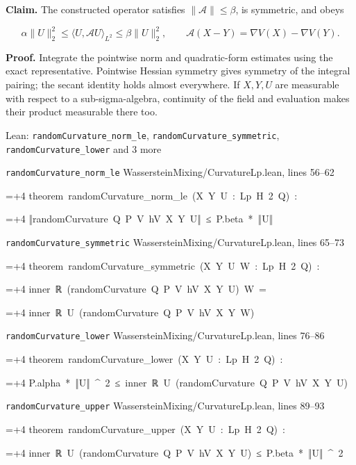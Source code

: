 \documentclass[11pt,a4paper]{article}
\newlength{\leancharwidth}
\newenvironment{leancode}{\par\smallskip\begingroup\ttfamily\footnotesize\raggedright
  \settowidth{\leancharwidth}{M}\setlength{\parskip}{0pt}\setlength{\parindent}{0pt}
  \frenchspacing}{\par\endgroup\smallskip}
\newcommand{\leanline}[2]{\hangindent=\dimexpr#1\leancharwidth+4\leancharwidth\relax
  \hangafter=1\noindent\hspace*{#1\leancharwidth}#2\par}
\newcommand{\leansource}[1]{\par{\footnotesize\color{leanmuted}#1}\par}
\begin{document}
\textbf{Claim.} The constructed operator satisfies \(\|\mathcal A\|\le\beta\), is symmetric, and obeys

\[\alpha\|U\|_2^2\le\langle U,\mathcal A U\rangle_{L^2}\le\beta\|U\|_2^2,\qquad \mathcal A(X-Y)=\nabla V(X)-\nabla V(Y).\]

\textbf{Proof.} Integrate the pointwise norm and quadratic-form estimates using the exact representative. Pointwise Hessian symmetry gives symmetry of the integral pairing; the secant identity holds almost everywhere. If \(X,Y,U\) are measurable with respect to a sub-sigma-algebra, continuity of the field and evaluation makes their product measurable there too.

\begin{leanbox}{Lean: \texttt{randomCurvature\_\allowbreak{}norm\_\allowbreak{}le}, \texttt{randomCurvature\_\allowbreak{}symmetric}, \texttt{randomCurvature\_\allowbreak{}lower} and 3 more}
\leansource{\texttt{randomCurvature\_\allowbreak{}norm\_\allowbreak{}le} \quad WassersteinMixing/\allowbreak{}CurvatureLp.lean, lines 56–62}
\begin{leancode}
\leanline{0}{theorem\ randomCurvature\_norm\_le\ (X\ Y\ U\ :\ Lp\ H\ 2\ Q)\ :}
\leanline{4}{‖randomCurvature\ Q\ P\ V\ hV\ X\ Y\ U‖\ ≤\ P.beta\ *\ ‖U‖}
\end{leancode}
\leansource{\texttt{randomCurvature\_\allowbreak{}symmetric} \quad WassersteinMixing/\allowbreak{}CurvatureLp.lean, lines 65–73}
\begin{leancode}
\leanline{0}{theorem\ randomCurvature\_symmetric\ (X\ Y\ U\ W\ :\ Lp\ H\ 2\ Q)\ :}
\leanline{4}{inner\ ℝ\ (randomCurvature\ Q\ P\ V\ hV\ X\ Y\ U)\ W\ =}
\leanline{6}{inner\ ℝ\ U\ (randomCurvature\ Q\ P\ V\ hV\ X\ Y\ W)}
\end{leancode}
\leansource{\texttt{randomCurvature\_\allowbreak{}lower} \quad WassersteinMixing/\allowbreak{}CurvatureLp.lean, lines 76–86}
\begin{leancode}
\leanline{0}{theorem\ randomCurvature\_lower\ (X\ Y\ U\ :\ Lp\ H\ 2\ Q)\ :}
\leanline{4}{P.alpha\ *\ ‖U‖\ \textasciicircum{}\ 2\ ≤\ inner\ ℝ\ U\ (randomCurvature\ Q\ P\ V\ hV\ X\ Y\ U)}
\end{leancode}
\leansource{\texttt{randomCurvature\_\allowbreak{}upper} \quad WassersteinMixing/\allowbreak{}CurvatureLp.lean, lines 89–93}
\begin{leancode}
\leanline{0}{theorem\ randomCurvature\_upper\ (X\ Y\ U\ :\ Lp\ H\ 2\ Q)\ :}
\leanline{4}{inner\ ℝ\ U\ (randomCurvature\ Q\ P\ V\ hV\ X\ Y\ U)\ ≤\ P.beta\ *\ ‖U‖\ \textasciicircum{}\ 2}

\end{leancode}
\end{leanbox}
\end{document}
